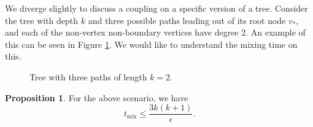 \documentclass[10pt,a4paper]{amsart}
\theoremstyle{definition}
\numberwithin{definition}{section}
\newtheorem{proposition}[definition]{Proposition}
\begin{document}
We diverge slightly to discuss a coupling on a specific version of a tree. Consider the tree with depth $k$ and three possible paths leading out of its root node $v_*$, and each of the non-vertex non-boundary vertices have degree $2$. An example of this can be seen in Figure \ref{fig:graph5}. We would like to understand the mixing time on this.

\begin{figure}

\begin{center}
\end{center}
\caption{Tree with three paths of length $k = 2$.}
\label{fig:graph5}
\end{figure}

\begin{proposition}\label{prop:ex}
For the above scenario, we have  
\[ t_{\text{mix}} \leq \frac{3k(k+1)}{\epsilon}.\]
\end{proposition}
\end{document}
